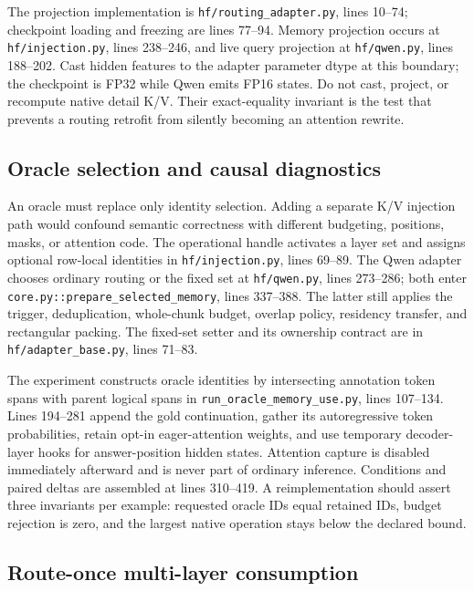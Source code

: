 \documentclass[11pt]{article}
\begin{document}
The projection implementation is \texttt{hf/routing\_adapter.py}, lines 10--74; checkpoint
loading and freezing are lines 77--94. Memory projection occurs at
\texttt{hf/injection.py}, lines 238--246, and live query projection at
\texttt{hf/qwen.py}, lines 188--202. Cast hidden features to the adapter parameter dtype at
this boundary; the checkpoint is FP32 while Qwen emits FP16 states. Do not cast, project, or
recompute native detail K/V. Their exact-equality invariant is the test that prevents a routing
retrofit from silently becoming an attention rewrite.

\subsection{Oracle selection and causal diagnostics}

An oracle must replace only identity selection. Adding a separate K/V injection path would
confound semantic correctness with different budgeting, positions, masks, or attention code.
The operational handle activates a layer set and assigns optional row-local identities in
\texttt{hf/injection.py}, lines 69--89. The Qwen adapter chooses ordinary routing or the fixed
set at \texttt{hf/qwen.py}, lines 273--286; both enter
\texttt{core.py::prepare\_selected\_memory}, lines 337--388. The latter still applies the
trigger, deduplication, whole-chunk budget, overlap policy, residency transfer, and rectangular
packing. The fixed-set setter and its ownership contract are in
\texttt{hf/adapter\_base.py}, lines 71--83.

The experiment constructs oracle identities by intersecting annotation token spans with parent
logical spans in \texttt{run\_oracle\_memory\_use.py}, lines 107--134. Lines 194--281 append the
gold continuation, gather its autoregressive token probabilities, retain opt-in eager-attention
weights, and use temporary decoder-layer hooks for answer-position hidden states. Attention
capture is disabled immediately afterward and is never part of ordinary inference. Conditions
and paired deltas are assembled at lines 310--419. A reimplementation should assert three
invariants per example: requested oracle IDs equal retained IDs, budget rejection is zero, and
the largest native operation stays below the declared bound.

\subsection{Route-once multi-layer consumption}
\end{document}
